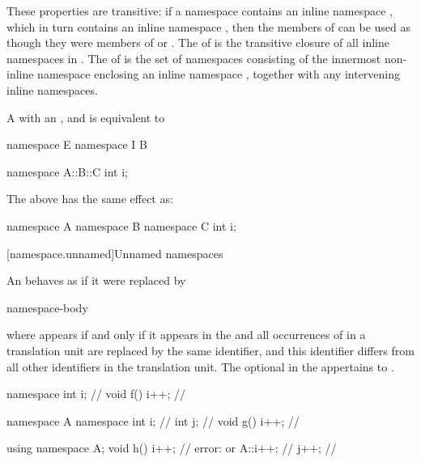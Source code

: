 \pnum
These properties are transitive: if a namespace  contains an inline namespace
, which in turn contains an inline namespace , then the members of
 can be used as though they were members of  or .
The  of  is the transitive closure of all
inline namespaces in .
The  of  is the set of namespaces
consisting of the innermost non-inline namespace enclosing
an inline namespace , together with any intervening inline namespaces.

\pnum
A  with an
 ,
  and
 
is equivalent to
\begin{codeblock}
namespace E { namespace I { B } }
\end{codeblock}
\enterexample
\begin{codeblock}
namespace A::B::C {
  int i;
}
\end{codeblock}
The above has the same effect as:
\begin{codeblock}
namespace A {
  namespace B {
    namespace C {
      int i;
    }
  }
}
\end{codeblock}
\exitexample

[namespace.unnamed]{Unnamed namespaces}%

\pnum
An  behaves as if it were
replaced by

\begin{ncsimplebnf}
\opt{}  \uniquens{} \br
{} \uniquens{} \terminal{;}\br
{} \uniquens{} \terminal{\{} namespace-body \terminal{\}}
\end{ncsimplebnf}

where
 appears if and only if it appears in the
and all occurrences of \uniquens{} in a translation unit are replaced by
the same identifier, and this identifier differs from all other
identifiers in the translation unit.
The optional 
in the 
appertains to \uniquens{}.
\enterexample

\begin{codeblock}
namespace { int i; }            // \uniquens{}
void f() { i++; }               // \uniquens{}

namespace A {
  namespace {
    int i;                      // \uniquens{}
    int j;                      // \uniquens{}
  }
  void g() { i++; }             // \uniquens{}
}

using namespace A;
void h() {
  i++;                          // error: \uniquens{} or \uniquens{}
  A::i++;                       // \uniquens{}
  j++;                          // \uniquens{}
}
\end{codeblock}
\exitexample

